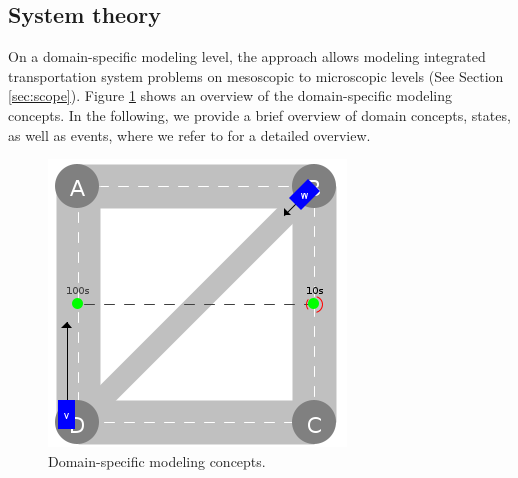 \documentclass[a4paper,twoside]{article}
\begin{document}
	
	
	\subsection{System theory}
	\label{sec:domain-specific-modeling}
	
	
	On a domain-specific modeling level, the approach allows modeling integrated transportation system problems on mesoscopic to microscopic levels (See Section  \ref{sec:scope}).
	Figure \ref{fig:domain-specific-modeling} shows an overview of the domain-specific modeling concepts. In the following, we provide a brief overview of domain concepts, states, as well as events, where we refer to \cite{ascher2023discrete} for a detailed overview. 
	\begin{figure}[!ht]
		\centering
		\includegraphics[width=0.6\columnwidth]{../../events/demand.png}
		\caption{Domain-specific modeling concepts.}
		\label{fig:domain-specific-modeling}
	\end{figure}
	
\end{document}
